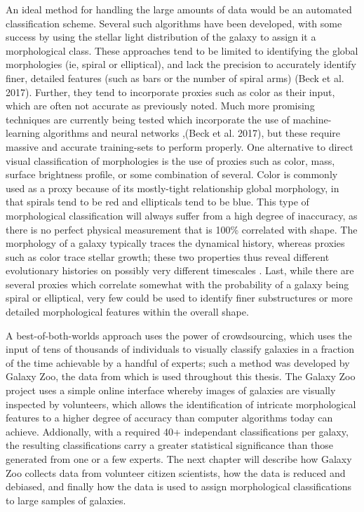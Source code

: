 An ideal method for handling the large amounts of data would be an automated classification scheme. Several such algorithms have been developed, with some success \citep{Odewahn2002,Peng2002,Conselice2003,Scarlata2007} by using the stellar light distribution of the galaxy to assign it a morphological class. These approaches tend to be limited to identifying the global morphologies (ie, spiral or elliptical), and lack the precision to accurately identify finer, detailed features (such as bars or the number of spiral arms) (Beck et al. 2017). Further, they tend to incorporate proxies such as color as their input, which are often not accurate as previously noted. Much more promising techniques are currently being tested which incorporate the use of machine-learning algorithms and neural networks \citep{Dieleman2015, Huertas-Company2015},(Beck et al. 2017), but these require massive and accurate training-sets to perform properly. 
One alternative to direct visual classification of morphologies is the use of proxies such as color, mass, surface brightness profile, or some combination of several. Color is commonly used as a proxy because of its mostly-tight relationship global morphology, in that spirals tend to be red and ellipticals tend to be blue. This type of morphological classification will always suffer from a high degree of inaccuracy, as there is no perfect physical measurement that is 100\% correlated with shape. The morphology of a galaxy typically traces the dynamical history, whereas proxies such as color trace stellar growth; these two properties thus reveal different evolutionary histories on possibly very different timescales \citet{Fortson2012}. Last, while there are several proxies which correlate somewhat with the probability of a galaxy being spiral or elliptical, very few could be used to identify finer substructures or more detailed morphological features within the overall shape. 

A best-of-both-worlds approach uses the power of crowdsourcing, which uses the input of tens of thousands of individuals to visually classify galaxies in a fraction of the time achievable by a handful of experts; such a method was developed by Galaxy Zoo, the data from which is used throughout this thesis. The Galaxy Zoo project uses a simple online interface whereby images of galaxies are visually inspected by volunteers, which allows the identification of intricate morphological features to a higher degree of accuracy than computer algorithms today can achieve. Addionally, with a required 40+ independant classifications per galaxy, the resulting classifications carry a greater statistical significance than those generated from one or a few experts. The next chapter will describe how Galaxy Zoo collects data from volunteer citizen scientists, how the data is reduced and debiased, and finally how the data is used to assign morphological classifications to large samples of galaxies.  








